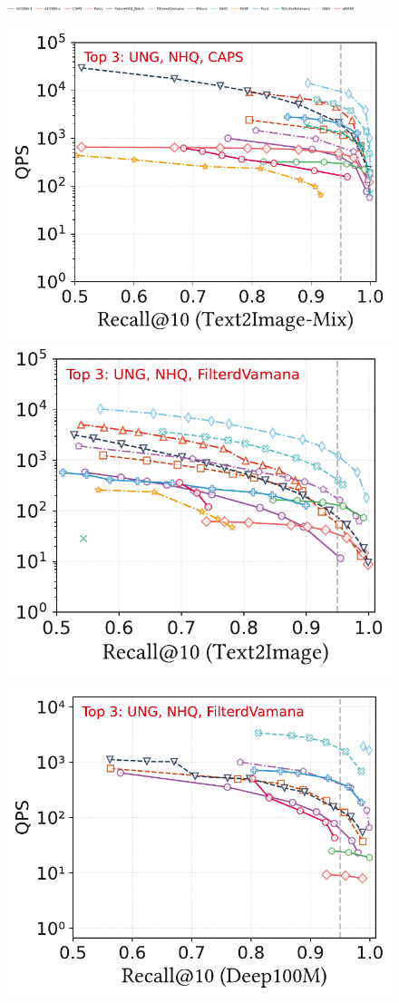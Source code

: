 \documentclass[sigconf, nonacm, pdfa]{acmart}
\begin{document}
{\begin{figure}
	\centering
	
	\includegraphics[width=0.9\textwidth]{figures/exp/attribute_legend.pdf}
	
	\begin{minipage}[t]{0.36\textwidth}
		\centering
		
		\includegraphics[width=0.495\linewidth]{figures/exp/attribute_multimodel.pdf}
		\hfill 
		\includegraphics[width=0.47\linewidth]{figures/exp/attribute_multimodel_1.pdf}
		
	\end{minipage}
	\hfill
	\begin{minipage}[t]{0.20\textwidth}
		\centering
		\includegraphics[width=0.9\linewidth]{figures/exp/attribute_100M.pdf} 
		

\end{minipage}
\end{figure}}
\end{document}
